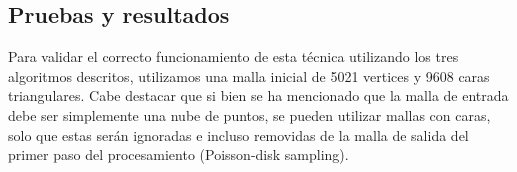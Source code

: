 \subsection{Pruebas y resultados}

Para validar el correcto funcionamiento de esta técnica utilizando los tres algoritmos descritos, utilizamos una malla inicial de 5021 vertices y 9608 caras triangulares. Cabe destacar que si bien se ha mencionado que la malla de entrada debe ser simplemente una nube de puntos, se pueden utilizar mallas con caras, solo que estas serán ignoradas e incluso removidas de la malla de salida del primer paso del procesamiento (Poisson-disk sampling).
